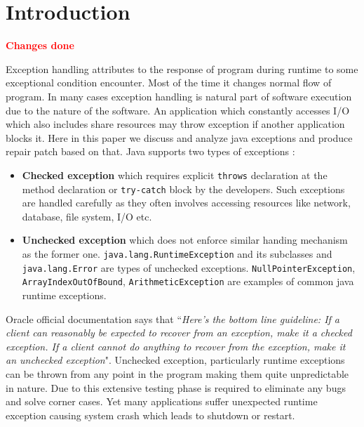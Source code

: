 \section{Introduction}
\label{sec:intro}

\textcolor{red}{\textbf{Changes done}}\newline

Exception handling attributes to the response of program during runtime to some
exceptional condition encounter.
Most of the time it changes normal flow of program. In many cases exception
handling is natural part of software execution due to the nature of the
software.
An application which constantly accesses I/O which also includes share resources
may throw exception if another application blocks it.
Here in this paper we discuss and analyze java exceptions and produce repair
patch based on that. Java supports two types of exceptions :
\begin{itemize}
	
\item \textbf{Checked exception} which requires explicit \texttt{throws}
declaration at the method declaration or \texttt{try-catch} block by the
developers. Such exceptions are handled carefully as they often involves
accessing resources like network, database, file system, I/O etc.
	
\item \textbf{Unchecked exception} which does not enforce similar handing
mechanism as the former one. \texttt{java.lang.RuntimeException} and its
subclasses and \texttt{java.lang.Error} are types of unchecked exceptions.
\texttt{NullPointerException}, \texttt{ArrayIndexOutOfBound},
\texttt{ArithmeticException} are examples of common java runtime exceptions.

\end{itemize}

Oracle official documentation says that ``\emph{Here's the bottom line
guideline: If a client can reasonably be expected to recover from an exception,
 make it a checked exception. If a client cannot do anything to recover from the
 exception, make it an unchecked exception}".
 Unchecked exception, particularly runtime exceptions can be thrown from any
 point in the program making them quite unpredictable in nature.
 Due to this extensive testing phase is required to eliminate any bugs and solve
 corner cases.
 Yet many applications suffer unexpected runtime exception causing system crash
 which leads to shutdown or restart.


